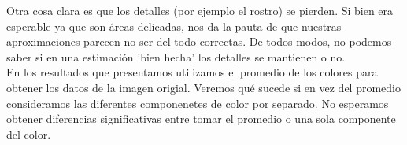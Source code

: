 


Otra cosa clara es que los detalles (por ejemplo el rostro) se pierden. Si bien era esperable ya que son áreas delicadas, nos da la pauta de que nuestras aproximaciones parecen no ser del todo correctas. De todos modos, no podemos saber si en una estimación 'bien hecha' los detalles se mantienen o no. \\


En los resultados que presentamos utilizamos el promedio de los colores para obtener los datos de la imagen origial. Veremos qué sucede si en vez del promedio consideramos las diferentes componenetes de color por separado. No esperamos obtener diferencias significativas entre tomar el promedio o una sola componente del color.

